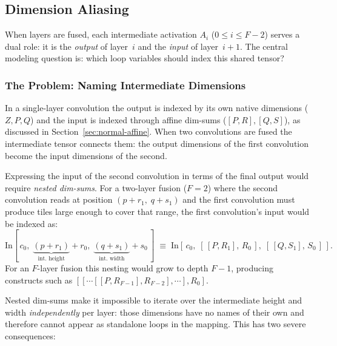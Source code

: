 \subsection{Dimension Aliasing}
\label{sec:ps-aliasing}

When layers are fused, each intermediate activation $A_i$
($0 \le i \le F\!-\!2$) serves a dual role: it is the \emph{output} of
layer~$i$ and the \emph{input} of layer~$i\!+\!1$.
The central modeling question is: which loop variables should index
this shared tensor?


\subsubsection{The Problem: Naming Intermediate Dimensions}

In a single-layer convolution the output is indexed by its own native
dimensions ($Z, P, Q$) and the input is indexed through affine
dim-sums ($[P, R], [Q, S]$), as discussed in
Section~\ref{sec:normal-affine}.
When two convolutions are fused the intermediate tensor connects them:
the output dimensions of the first convolution become the input
dimensions of the second.

Expressing the input of the second
convolution in terms of the final output would require
\emph{nested dim-sums}.
For a two-layer fusion ($F\!=\!2$) where the second convolution reads
at position $(p + r_1,\; q + s_1)$ and the first convolution must
produce tiles large enough to cover that range, the first
convolution's input would be indexed as:
%
\[
  \text{In}[\,c_0,\;
    \underbrace{(p + r_1)}_{\text{int.\ height}} + r_0,\;
    \underbrace{(q + s_1)}_{\text{int.\ width}} + s_0\,]
  \;\equiv\;
  \text{In}[\,c_0,\;
    [\,[P, R_1],\, R_0\,],\;
    [\,[Q, S_1],\, S_0\,]\,].
\]
%
For an $F$-layer fusion this nesting would grow to depth $F\!-\!1$,
producing constructs such as
$[[\cdots[[P, R_{F-1}], R_{F-2}], \cdots], R_0]$.

Nested dim-sums make it impossible to iterate over
the intermediate height and width \emph{independently} per layer: those
dimensions have no names of their own and therefore cannot appear as
standalone loops in the mapping.
This has two severe consequences:

